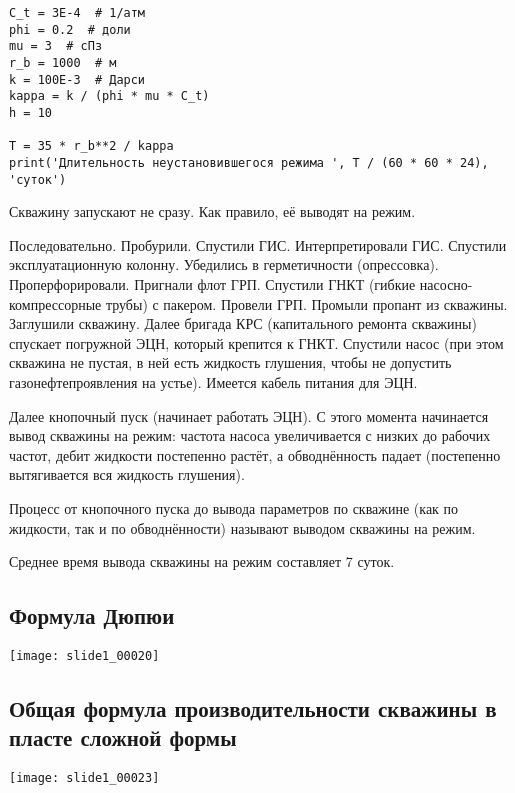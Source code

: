 \documentclass[main.tex]{subfiles}
\begin{document}
\begin{listing}[h]
\begin{verbatim}
C_t = 3E-4  # 1/атм
phi = 0.2  # доли
mu = 3  # сПз
r_b = 1000  # м
k = 100E-3  # Дарси
kappa = k / (phi * mu * C_t)
h = 10

T = 35 * r_b**2 / kappa
print('Длительность неустановившегося режима ', T / (60 * 60 * 24), 'суток')
\end{verbatim}
\end{listing}

Скважину запускают не сразу. Как правило, её выводят на режим.

Последовательно. Пробурили. Спустили ГИС. Интерпретировали ГИС. Спустили эксплуатационную колонну. Убедились в герметичности (опрессовка). Проперфорировали. Пригнали флот ГРП. Спустили ГНКТ (гибкие насосно-компрессорные трубы) с пакером. Провели ГРП. Промыли пропант из скважины. Заглушили скважину. Далее бригада КРС (капитального ремонта скважины) спускает погружной ЭЦН, который крепится к ГНКТ. Спустили насос (при этом скважина не пустая, в ней есть жидкость глушения, чтобы не допустить газонефтепроявления на устье). Имеется кабель питания для ЭЦН.

Далее кнопочный пуск (начинает работать ЭЦН). С этого момента начинается вывод скважины на режим: частота насоса увеличивается с низких до рабочих частот, дебит жидкости постепенно растёт, а обводнённость падает (постепенно вытягивается вся жидкость глушения).

Процесс от кнопочного пуска до вывода параметров по скважине (как по жидкости, так и по обводнённости) называют выводом скважины на режим.

Среднее время вывода скважины на режим составляет 7 суток.

\subsection{Формула Дюпюи}
\texttt{[image: slide1\_00020]}



\subsection{Общая формула производительности скважины в пласте сложной формы}

\texttt{[image: slide1\_00023]}
\end{document}
